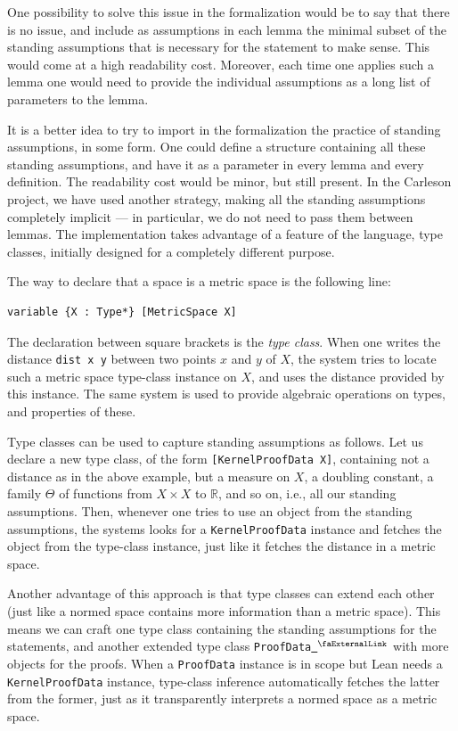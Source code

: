 \documentclass[12pt]{amsart}
\newcounter{lstlisting}[section]
\newcommand{\lean}[1]{\lstinline{#1}}
\newcommand*{\real}{\mathbb{R}} %
\newcommand{\extlink}{~\ensuremath{{}^\text{\faExternalLink}}}
\theoremstyle{definition}
\theoremstyle{plain}
\begin{document}
One possibility to solve this issue in the formalization would be to say that
there is no issue, and include as assumptions in each lemma the minimal
subset of the standing assumptions that is necessary for the statement to
make sense. This would come at a high readability cost. Moreover, each time
one applies such a lemma one would need to provide the individual assumptions
as a long list of parameters to the lemma.

It is a better idea to try to import in the formalization the practice of
standing assumptions, in some form. One could define a
structure containing all these standing assumptions, and have it as a
parameter in every lemma and every definition. The readability cost would be
minor, but still present. In the Carleson project, we have used another
strategy, making all the standing assumptions completely implicit --- in
particular, we do not need to pass them between lemmas. The implementation
takes advantage of a feature of the language, type classes, initially designed
for a completely different purpose.

The way to declare that a space is a metric space is the following line:
\begin{lstlisting}[mathescape]
variable {X : Type*} [MetricSpace X]
\end{lstlisting}

The declaration between square brackets is the \emph{type class}. When one writes the
distance \texttt{dist x y} between two points $x$ and $y$ of $X$, the system
tries to locate such a metric space type-class instance on $X$, and uses the distance
provided by this instance. The same system is used to provide algebraic
operations on types, and properties of these.

Type classes can be used to capture standing assumptions as follows.
Let us declare a new type class, of the form \lean{[KernelProofData X]},
containing not a distance as in the above example, but a measure on $X$,
a doubling constant, a family $\Theta$ of functions from $X \times X$ to
$\real$, and so on, i.e., all our standing assumptions. Then, whenever one
tries to use an object from the standing assumptions, the systems looks for a
\lean{KernelProofData} instance and fetches the object from the type-class
instance, just like it fetches the distance in a metric space.

Another advantage of this approach is that type classes can extend each other
(just like a normed space contains more information than a metric space).
This means we can craft one type class containing the standing assumptions for
the statements, and another extended type class \lean{ProofData}\href{https://github.com/fpvandoorn/carleson/blob/020d6e5c71d731952eb0379d222eea4049103ca0/Carleson/ProofData.lean#L20}{\extlink} with more
objects for the proofs. When a \lean{ProofData} instance is in scope but
Lean needs a \lean{KernelProofData} instance, type-class inference
automatically fetches the latter from the former, just as it transparently
interprets a normed space as a metric space.
\end{document}
